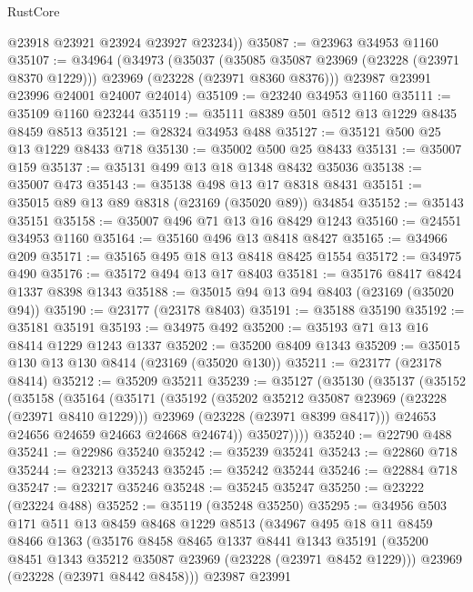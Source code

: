 \begin{lexlean}{RustCore}
\begin{coremodule}
        @23918
        @23921
        @23924
        @23927
        @23234))
@35087 := @23963 @34953 @1160
@35107 := @34964
    (@34973
      (@35037
        (@35085 @35087 @23969 (@23228 (@23971 @8370 @1229)))
        @23969
        (@23228 (@23971 @8360 @8376)))
      @23987
      @23991
      @23996
      @24001
      @24007
      @24014)
@35109 := @23240 @34953 @1160
@35111 := @35109 @1160 @23244
@35119 := @35111 @8389 @501 @512 @13 @1229 @8435 @8459 @8513
@35121 := @28324 @34953 @488
@35127 := @35121 @500 @25 @13 @1229 @8433 @718
@35130 := @35002 @500 @25 @8433
@35131 := @35007 @159
@35137 := @35131 @499 @13 @18 @1348 @8432 @35036
@35138 := @35007 @473
@35143 := @35138 @498 @13 @17 @8318 @8431
@35151 := @35015 @89 @13 @89 @8318 (@23169 (@35020 @89)) @34854
@35152 := @35143 @35151
@35158 := @35007 @496 @71 @13 @16 @8429 @1243
@35160 := @24551 @34953 @1160
@35164 := @35160 @496 @13 @8418 @8427
@35165 := @34966 @209
@35171 := @35165 @495 @18 @13 @8418 @8425 @1554
@35172 := @34975 @490
@35176 := @35172 @494 @13 @17 @8403
@35181 := @35176 @8417 @8424 @1337 @8398 @1343
@35188 := @35015 @94 @13 @94 @8403 (@23169 (@35020 @94))
@35190 := @23177 (@23178 @8403)
@35191 := @35188 @35190
@35192 := @35181 @35191
@35193 := @34975 @492
@35200 := @35193 @71 @13 @16 @8414 @1229 @1243 @1337
@35202 := @35200 @8409 @1343
@35209 := @35015 @130 @13 @130 @8414 (@23169 (@35020 @130))
@35211 := @23177 (@23178 @8414)
@35212 := @35209 @35211
@35239 := @35127
    (@35130
      (@35137
        (@35152
          (@35158
            (@35164
              (@35171
                (@35192
                  (@35202 @35212 @35087 @23969 (@23228 (@23971 @8410 @1229)))
                  @23969
                  (@23228 (@23971 @8399 @8417)))
                @24653
                @24656
                @24659
                @24663
                @24668
                @24674))
            @35027))))
@35240 := @22790 @488
@35241 := @22986 @35240
@35242 := @35239 @35241
@35243 := @22860 @718
@35244 := @23213 @35243
@35245 := @35242 @35244
@35246 := @22884 @718
@35247 := @23217 @35246
@35248 := @35245 @35247
@35250 := @23222 (@23224 @488)
@35252 := @35119 (@35248 @35250)
@35295 := @34956
    @503
    @171
    @511
    @13
    @8459
    @8468
    @1229
    @8513
    (@34967
      @495
      @18
      @11
      @8459
      @8466
      @1363
      (@35176
        @8458
        @8465
        @1337
        @8441
        @1343
        @35191
        (@35200 @8451 @1343 @35212 @35087 @23969 (@23228 (@23971 @8452 @1229)))
        @23969
        (@23228 (@23971 @8442 @8458)))
      @23987
      @23991

\end{coremodule}
\end{lexlean}
